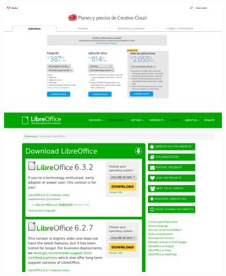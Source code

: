 \documentclass{fancyslides}
\begin{document}
\begin{frame}
	\begin{figure}
		\centering
		\includegraphics[width=1\linewidth]{images/adobe}
		\label{fig:adobe}
	\end{figure}
\end{frame}

\begin{frame}
\end{frame}

\begin{frame}
	\begin{figure}
		\centering
		\includegraphics[width=1\linewidth]{images/libreoffice}
		\label{fig:libreoffice}
	\end{figure}
\end{frame}
\end{document}
